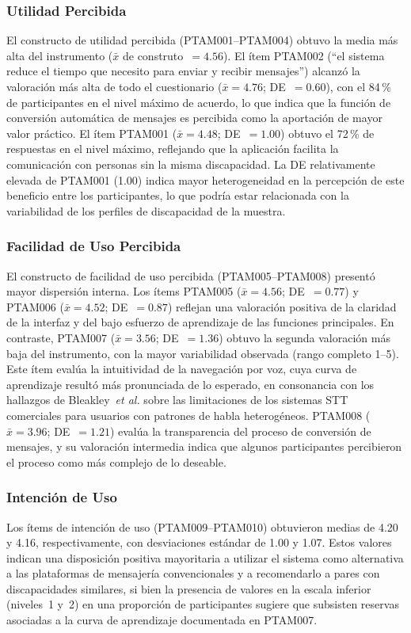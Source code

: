 \documentclass[journal]{IEEEtran}
\begin{document}
			\subsubsection{Utilidad Percibida}
				El constructo de utilidad percibida (PTAM001--PTAM004) obtuvo la media m\'as alta del instrumento ($\bar{x}$ de construto~$= 4.56$). El \'item PTAM002 (``el sistema reduce el tiempo que necesito para enviar y recibir mensajes'') alcanz\'o la valoraci\'on m\'as alta de todo el cuestionario ($\bar{x}=4.76$; DE~$=0.60$), con el 84\,\% de participantes en el nivel m\'aximo de acuerdo, lo que indica que la funci\'on de conversi\'on autom\'atica de mensajes es percibida como la aportaci\'on de mayor valor pr\'actico. El \'item PTAM001 ($\bar{x}=4.48$; DE~$=1.00$) obtuvo el 72\,\% de respuestas en el nivel m\'aximo, reflejando que la aplicaci\'on facilita la comunicaci\'on con personas sin la misma discapacidad. La DE relativamente elevada de PTAM001 (1.00) indica mayor heterogeneidad en la percepci\'on de este beneficio entre los participantes, lo que podr\'ia estar relacionada con la variabilidad de los perfiles de discapacidad de la muestra.
				
			\subsubsection{Facilidad de Uso Percibida}
				El constructo de facilidad de uso percibida (PTAM005--PTAM008) present\'o mayor dispersi\'on interna. Los \'items PTAM005 ($\bar{x}=4.56$; DE~$=0.77$) y PTAM006 ($\bar{x}=4.52$; DE~$=0.87$) reflejan una valoraci\'on positiva de la claridad de la interfaz y del bajo esfuerzo de aprendizaje de las funciones principales. En contraste, PTAM007 ($\bar{x}=3.56$; DE~$=1.36$) obtuvo la segunda valoraci\'on m\'as baja del instrumento, con la mayor variabilidad observada (rango completo 1--5). Este \'item eval\'ua la intuitividad de la navegaci\'on por voz, cuya curva de aprendizaje result\'o m\'as pronunciada de lo esperado, en consonancia con los hallazgos de Bleakley~\textit{et al.} \cite{bleakley2022} sobre las limitaciones de los sistemas STT comerciales para usuarios con patrones de habla heterog\'eneos. PTAM008 ($\bar{x}=3.96$; DE~$=1.21$) eval\'ua la transparencia del proceso de conversi\'on de mensajes, y su valoraci\'on intermedia indica que algunos participantes percibieron el proceso como m\'as complejo de lo deseable.
				
			\subsubsection{Intenci\'on de Uso}
				Los \'items de intenci\'on de uso (PTAM009--PTAM010) obtuvieron medias de 4.20 y 4.16, respectivamente, con desviaciones est\'andar de 1.00 y 1.07. Estos valores indican una disposici\'on positiva mayoritaria a utilizar el sistema como alternativa a las plataformas de mensajer\'ia convencionales y a recomendarlo a pares con discapacidades similares, si bien la presencia de valores en la escala inferior (niveles~1 y~2) en una proporci\'on de participantes sugiere que subsisten reservas asociadas a la curva de aprendizaje documentada en PTAM007.
				
\end{document}
